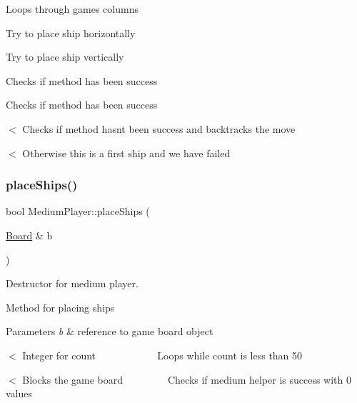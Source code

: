 Loops through game\textquotesingle{}s columns

Try to place ship horizontally

Try to place ship vertically

Checks if method has been success

Checks if method has been success

$<$ Checks if method hasn\textquotesingle{}t been success and backtracks the move

$<$ Otherwise this is a first ship and we have failed \mbox{\label{class_medium_player_ac4d4748e2c27a2a51033bbce9f12de26}} 
\subsubsection{\texorpdfstring{place\+Ships()}{placeShips()}}
{\footnotesize\ttfamily bool Medium\+Player\+::place\+Ships (\begin{DoxyParamCaption}\item[{\mbox{\hyperlink{class_board}{Board}} \&}]{b }\end{DoxyParamCaption})\hspace{0.3cm}{\ttfamily [virtual]}}



Destructor for medium player. 

Method for placing ships 
\begin{DoxyParams}{Parameters}
{\em b} & reference to game board object \\
\hline
\end{DoxyParams}
$<$ Integer for count ~\newline
~\newline
~\newline
~\newline
~\newline
~\newline
~\newline
 Loops while count is less than 50

$<$ Blocks the game board ~\newline
~\newline
~\newline
~\newline
~\newline
 Checks if medium helper is success with 0 values

